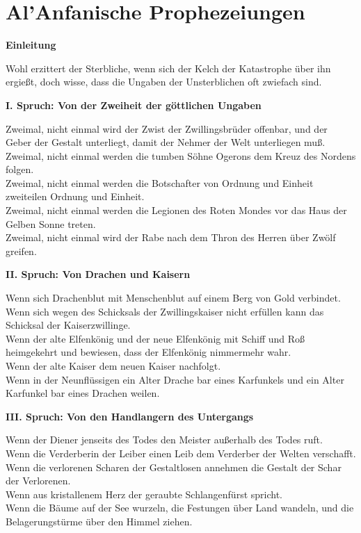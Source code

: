 \chapter{Al'Anfanische Prophezeiungen}

\textbf{Einleitung}

Wohl erzittert der Sterbliche, wenn sich der Kelch der Katastrophe über ihn ergießt, doch wisse, dass die Ungaben der Unsterblichen oft zwiefach sind.

\textbf{I. Spruch: Von der Zweiheit der göttlichen Ungaben}

Zweimal, nicht einmal wird der Zwist der Zwillingsbrüder offenbar, und der Geber der Gestalt unterliegt, damit der Nehmer der Welt unterliegen muß.\\
Zweimal, nicht einmal werden die tumben Söhne Ogerons dem Kreuz des Nordens folgen.\\
Zweimal, nicht einmal werden die Botschafter von Ordnung und Einheit zweiteilen Ordnung und Einheit.\\
Zweimal, nicht einmal werden die Legionen des Roten Mondes vor das Haus der Gelben Sonne treten.\\
Zweimal, nicht einmal wird der Rabe nach dem Thron des Herren über Zwölf greifen.

\textbf{II. Spruch: Von Drachen und Kaisern}

Wenn sich Drachenblut mit Menschenblut auf einem Berg von Gold verbindet.\\
Wenn sich wegen des Schicksals der Zwillingskaiser nicht erfüllen kann das Schicksal der Kaiserzwillinge.\\
Wenn der alte Elfenkönig und der neue Elfenkönig mit Schiff und Roß heimgekehrt und bewiesen, dass der Elfenkönig nimmermehr wahr.\\
Wenn der alte Kaiser dem neuen Kaiser nachfolgt.\\
Wenn in der Neunflüssigen ein Alter Drache bar eines Karfunkels und ein Alter Karfunkel bar eines Drachen weilen.

\textbf{III. Spruch: Von den Handlangern des Untergangs}

Wenn der Diener jenseits des Todes den Meister außerhalb des Todes ruft.\\
Wenn die Verderberin der Leiber einen Leib dem Verderber der Welten verschafft.\\
Wenn die verlorenen Scharen der Gestaltlosen annehmen die Gestalt der Schar der Verlorenen.\\
Wenn aus kristallenem Herz der geraubte Schlangenfürst spricht.\\
Wenn die Bäume auf der See wurzeln, die Festungen über Land wandeln, und die Belagerungstürme über den Himmel ziehen.

